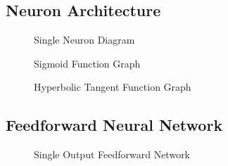 \subsection{Neuron Architecture}

\begin{figure}
	\centering
	
	\caption{Single Neuron Diagram}
\end{figure}

\begin{figure}[ht]
	\centering
	
	\caption{Sigmoid Function Graph}
\end{figure}

\begin{figure}[ht]
	\centering
	
	\caption{Hyperbolic Tangent Function Graph}
\end{figure}

\subsection{Feedforward Neural Network}

\begin{figure}[ht]
	\centering
	
	\caption{Single Output Feedforward Network}
\end{figure}